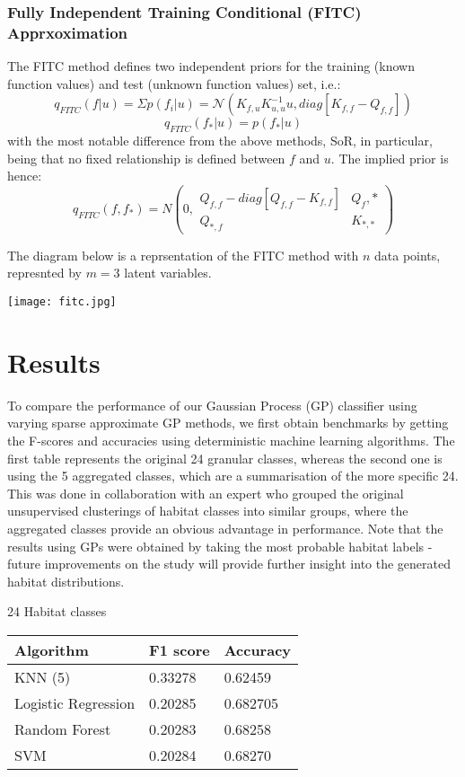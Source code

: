 \documentclass[journal]{IEEEtran}
\begin{document}
    \subsubsection{Fully Independent Training Conditional (FITC) Apprxoximation}
    The FITC method defines two independent priors for the training (known function values) and test (unknown function values) set, i.e.:
    $$ q_{FITC}(f | u) = \Sigma p(f_i | u) = \mathcal{N}(K_{f,u}K^{-1}_{u,u}u, diag[K_{f,f} - Q_{f,f}]) $$
    $$ q_{FITC}(f_* | u) = p(f_* | u) $$
    with the most notable difference from the above methods, SoR, in particular, being that no fixed relationship is defined between $f$ and $u$. 
    The implied prior is hence:
    $$ q_{FITC}(f, f_*) = N\left( 0, 
    \begin{matrix}  
        Q_{f, f} - diag[Q_{f,f} - K_{f,f}] & Q_f,* \\
        Q_{*,f} & K_{*,*}
    \end{matrix}
        \right)$$

        The diagram below is a reprsentation of the FITC method with $n$ data points, represnted by $m = 3$ latent variables.

    \texttt{[image: fitc.jpg]}

\section{Results}

To compare the performance of our Gaussian Process (GP) classifier using varying sparse approximate GP methods, we first obtain benchmarks by getting the F-scores and accuracies using deterministic machine learning algorithms. The first table represents the original 24 granular classes, whereas the second one is using the 5 aggregated classes, which are a summarisation of the more specific 24. This was done in collaboration with an expert who grouped the original unsupervised clusterings of habitat classes into similar groups, where the aggregated classes provide an obvious advantage in performance. Note that the results using GPs were obtained by taking the most probable habitat labels - future improvements on the study will provide further insight into the generated habitat distributions.
    
24 Habitat classes

\begin{tabular}{| l | l | l |}
    \hline
    Algorithm           & F1 score & Accuracy \\\hline
    KNN (5)             & 0.33278 & 0.62459 \\
    Logistic Regression & 0.20285 & 0.682705 \\
    Random Forest       & 0.20283 & 0.68258 \\
    SVM                 & 0.20284 & 0.68270 \\\hline
\end{tabular}
\end{document}
